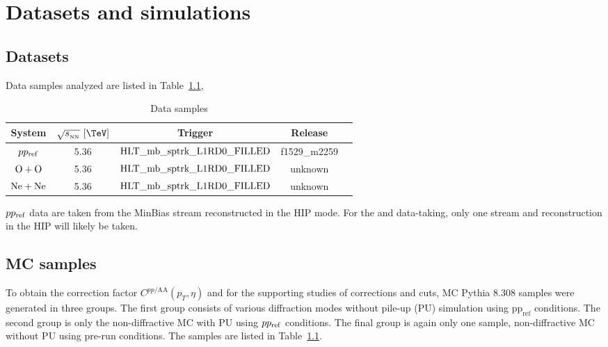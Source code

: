 \chapter{Datasets and simulations}
\label{chap:dataset}
\section{Datasets}
Data samples analyzed are listed in Table~\ref{tab:comb}, 
\begin{table}[!h]
\begin{center}
\renewcommand{\arraystretch}{1.5} %
\setlength{\tabcolsep}{2.5pt} %
\begin{tabular}{ccccc}
System & $\sqn\ [\TeV]$ & Trigger & Release \\ \hline
$pp_{\mathrm{ref}}$  & 5.36 & $\text{HLT\_mb\_sptrk\_L1RD0\_FILLED}$ & f1529\_m2259  \\
$\OO$  & 5.36 & $\text{HLT\_mb\_sptrk\_L1RD0\_FILLED}$ & unknown  \\
$\NeNe$  & 5.36 & $\text{HLT\_mb\_sptrk\_L1RD0\_FILLED}$ & unknown  \\
\end{tabular}
\end{center}
\caption{Data samples}
\label{tab:comb}
\end{table}
$pp_{\mathrm{ref}}$ data are taken from the MinBias stream reconstructed in the HIP mode. For the \OO and \NeNe data-taking, only one stream and reconstruction in the HIP will likely be taken.  \black{}

\section{MC samples}
To obtain the correction factor $C^{pp/\text{AA}}(p_T, \eta)$ and for the supporting studies of corrections and cuts, MC Pythia 8.308 samples were generated in three groups. The first group consists of various diffraction modes without pile-up (PU) simulation using $\mathrm{pp_{ref}}$ conditions. The second group is only the non-diffractive MC with PU using $pp_{\mathrm{ref}}$ conditions. The final group is again only one sample, non-diffractive MC without PU using pre-\OO run conditions. The samples are listed in Table~\ref{tab:comb}.

